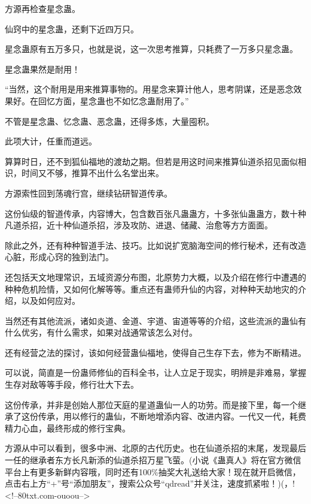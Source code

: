 \begin{this_body}
方源再检查星念蛊。

仙窍中的星念蛊，还剩下近四万只。

星念蛊原有五万多只，也就是说，这一次思考推算，只耗费了一万多只星念蛊。

星念蛊果然是耐用！

“当然，这个耐用是用来推算事物的。用星念来算计他人，思考阴谋，还是恶念效果好。在回忆方面，星念蛊也不如忆念蛊耐用了。”

不管是星念蛊、忆念蛊、恶念蛊，还得多炼，大量囤积。

此项大计，任重而道远。

算算时日，还不到狐仙福地的渡劫之期。但若是用这时间来推算仙道杀招见面似相识，时间又不够，推算不出什么名堂出来。

方源索性回到荡魂行宫，继续钻研智道传承。

这份仙级的智道传承，内容博大，包含数百张凡蛊蛊方，十多张仙蛊蛊方，数十种凡道杀招，近十种仙道杀招，涉及攻防、进退、储藏、治愈等方方面面。

除此之外，还有种种智道手法、技巧。比如说扩宽脑海空间的修行秘术，还有改造心脏，形成心窍的独到法门。

还包括天文地理常识，五域资源分布图，北原势力大概，以及介绍在修行中遭遇的种种危机险情，又如何化解等等。重点还有蛊师升仙的内容，对种种天劫地灾的介绍，以及如何应对。

当然还有其他流派，诸如炎道、金道、宇道、宙道等等的介绍，这些流派的蛊仙有什么优劣，有什么需求，如果对战通常该怎么对付。

还有经营之法的探讨，该如何经营蛊仙福地，使得自己生存下去，修为不断精进。

可以说，简直是一份蛊师修仙的百科全书，让人立足于现实，明辨是非难易，掌握生存对敌等等手段，修行壮大下去。

这份传承，并非是创始人那位天庭的星道蛊仙一人的功劳。而是接下里，每一个继承了这份传承，用以修行的蛊仙，不断地增添内容、改进内容。一代又一代，耗费精力心血，最终形成的修行宝典。

方源从中可以看到，很多中洲、北原的古代历史。也在仙道杀招的末尾，发现最后一任的继承者东方长凡新添的仙道杀招万星飞萤。(小说《蛊真人》将在官方微信平台上有更多新鲜内容哦，同时还有100\%抽奖大礼送给大家！现在就开启微信，点击右上方“+”号“添加朋友”，搜索公众号“qdread”并关注，速度抓紧啦！)(，!<!--80txt.com-ouoou-->

\end{this_body}

